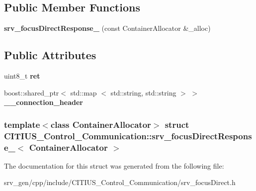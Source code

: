 \subsection*{\-Public \-Member \-Functions}
\begin{DoxyCompactItemize}
\item 
\hypertarget{struct_c_i_t_i_u_s___control___communication_1_1srv__focus_direct_response___af9036ccbfbbc8d9e7f0906b602c1e2e0}{{\bfseries srv\-\_\-focus\-Direct\-Response\-\_\-} (const \-Container\-Allocator \&\-\_\-alloc)}\label{struct_c_i_t_i_u_s___control___communication_1_1srv__focus_direct_response___af9036ccbfbbc8d9e7f0906b602c1e2e0}

\end{DoxyCompactItemize}
\subsection*{\-Public \-Attributes}
\begin{DoxyCompactItemize}
\item 
\hypertarget{struct_c_i_t_i_u_s___control___communication_1_1srv__focus_direct_response___a79c0dfb2f80c43b3456caf0469040b12}{uint8\-\_\-t {\bfseries ret}}\label{struct_c_i_t_i_u_s___control___communication_1_1srv__focus_direct_response___a79c0dfb2f80c43b3456caf0469040b12}

\item 
\hypertarget{struct_c_i_t_i_u_s___control___communication_1_1srv__focus_direct_response___a2e4ee724bf713576b1dba60a0c6f0876}{boost\-::shared\-\_\-ptr$<$ std\-::map\*
$<$ std\-::string, std\-::string $>$ $>$ {\bfseries \-\_\-\-\_\-connection\-\_\-header}}\label{struct_c_i_t_i_u_s___control___communication_1_1srv__focus_direct_response___a2e4ee724bf713576b1dba60a0c6f0876}

\end{DoxyCompactItemize}
\subsubsection*{template$<$class Container\-Allocator$>$ struct C\-I\-T\-I\-U\-S\-\_\-\-Control\-\_\-\-Communication\-::srv\-\_\-focus\-Direct\-Response\-\_\-$<$ Container\-Allocator $>$}



\-The documentation for this struct was generated from the following file\-:\begin{DoxyCompactItemize}
\item 
srv\-\_\-gen/cpp/include/\-C\-I\-T\-I\-U\-S\-\_\-\-Control\-\_\-\-Communication/srv\-\_\-focus\-Direct.\-h\end{DoxyCompactItemize}
